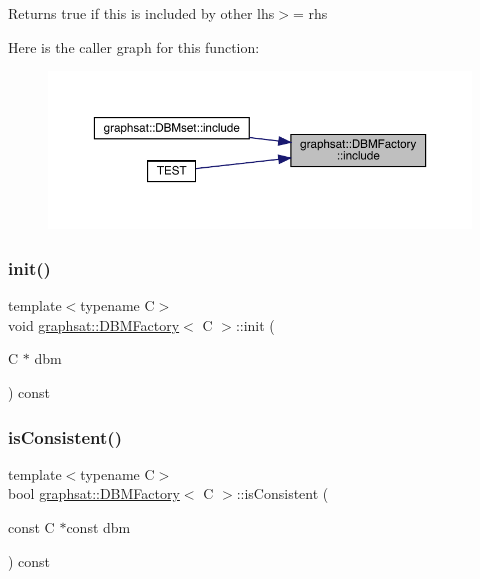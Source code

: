 \begin{DoxyReturn}{Returns}
true if this is included by other lhs$>$= rhs 
\end{DoxyReturn}
Here is the caller graph for this function\+:
\nopagebreak
\begin{figure}[H]
\begin{center}
\leavevmode
\includegraphics[width=350pt]{classgraphsat_1_1_d_b_m_factory_a449e577089eb65bafab1fdfb40540da5_icgraph}
\end{center}
\end{figure}
\mbox{\label{classgraphsat_1_1_d_b_m_factory_aaeae7653989fa7e0fcb32d2f54eb1cc1}} 
\subsubsection{\texorpdfstring{init()}{init()}}
{\footnotesize\ttfamily template$<$typename C$>$ \\
void \mbox{\hyperlink{classgraphsat_1_1_d_b_m_factory}{graphsat\+::\+D\+B\+M\+Factory}}$<$ C $>$\+::init (\begin{DoxyParamCaption}\item[{C $\ast$}]{dbm }\end{DoxyParamCaption}) const\hspace{0.3cm}{\ttfamily [inline]}}

\mbox{\label{classgraphsat_1_1_d_b_m_factory_a29c2a503d13babf1c536476dc85e2c6a}} 
\subsubsection{\texorpdfstring{isConsistent()}{isConsistent()}}
{\footnotesize\ttfamily template$<$typename C$>$ \\
bool \mbox{\hyperlink{classgraphsat_1_1_d_b_m_factory}{graphsat\+::\+D\+B\+M\+Factory}}$<$ C $>$\+::is\+Consistent (\begin{DoxyParamCaption}\item[{const C $\ast$const}]{dbm }\end{DoxyParamCaption}) const\hspace{0.3cm}{\ttfamily [inline]}}

